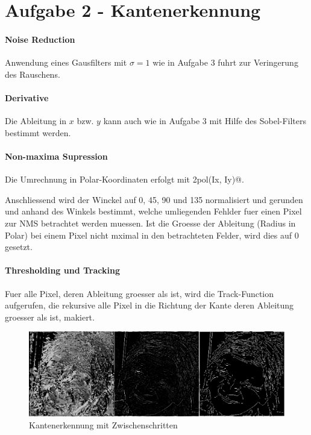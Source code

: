 \section*{Aufgabe 2 - Kantenerkennung}
\paragraph{Noise Reduction}
Anwendung eines Gausfilters mit $\sigma=1$ wie in Aufgabe 3 fuhrt zur Veringerung des Rauschens.

\paragraph{Derivative}
Die Ableitung in $x$ bzw. $y$ kann auch wie in Aufgabe 3 mit Hilfe des Sobel-Filters bestimmt werden.

\paragraph{Non-maxima Supression}
Die Umrechnung in Polar-Koordinaten erfolgt mit \lstinline@card2pol(Ix, Iy)@.

Anschliessend wird der Winckel auf 0, 45, 90 und 135 normalisiert und gerunden und anhand des
Winkels bestimmt, welche umliegenden Fehlder fuer einen Pixel zur NMS betrachtet werden muessen.
Ist die Groesse der Ableitung (Radius in Polar) bei einem Pixel nicht mximal in
den betrachteten Felder, wird dies auf 0 gesetzt.

\paragraph{Thresholding und Tracking}
Fuer alle Pixel, deren Ableitung groesser als \lstinline@maxtres@ ist, wird die Track-Function aufgerufen,
die rekursive alle Pixel in die Richtung der Kante deren Ableitung groesser als \lstinline@mintres@ ist,
makiert.

\begin{figure}[H]
\begin{center}
\includegraphics[width=150mm]{u06/t2.eps}
\end{center}
\caption{Kantenerkennung mit Zwischenschritten}
\end{figure}

